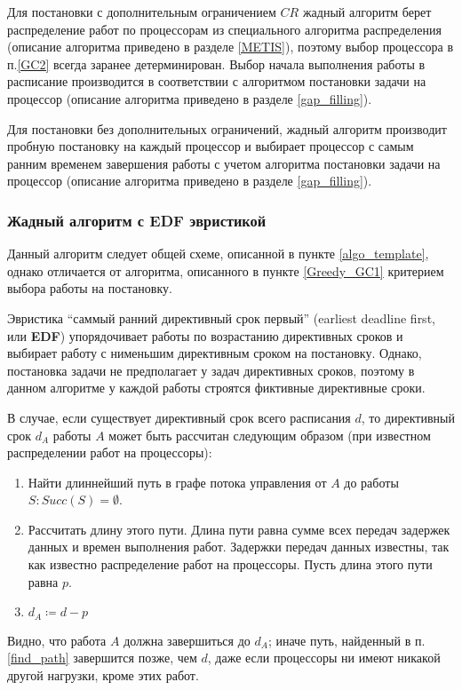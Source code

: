 Для постановки с дополнительным ограничением $CR$ жадный алгоритм берет распределение работ по процессорам из специального алгоритма распределения (описание алгоритма приведено в разделе \ref{METIS}), поэтому выбор процессора в п.\ref{GC2} всегда заранее детерминирован. Выбор начала выполнения работы в расписание производится в соответствии с алгоритмом постановки задачи на процессор (описание алгоритма приведено в разделе \ref{gap_filling}).

Для постановки без дополнительных ограничений, жадный алгоритм производит пробную постановку на каждый процессор и выбирает процессор с самым ранним временем завершения работы с учетом алгоритма постановки задачи на процессор (описание алгоритма приведено в разделе \ref{gap_filling}). 

\subsubsection{Жадный алгоритм с EDF эвристикой} \label{Greedy_EDF}
Данный алгоритм следует общей схеме, описанной в пункте \ref{algo_template}, однако отличается от алгоритма, описанного в пункте \ref{Greedy_GC1} критерием выбора работы на постановку.

Эвристика ``саммый ранний директивный срок первый'' (earliest deadline first, или \textbf{EDF}) упорядочивает работы по возрастанию директивных сроков и выбирает работу с нименьшим директивным сроком на постановку. Однако, постановка задачи не предполагает у задач директивных сроков, поэтому в данном алгоритме у каждой работы строятся фиктивные директивные сроки.

В случае, если существует директивный срок всего расписания $d$, то директивный срок $d_A$ работы $A$ может быть рассчитан следующим образом (при известном распределении работ на процессоры):
\begin{enumerate}
    \item \label{find_path} Найти длиннейший путь в графе потока управления от $A$ до работы $S: Succ(S) = \emptyset$.
    \item Рассчитать длину этого пути. Длина пути равна сумме всех передач задержек данных и времен выполнения работ. Задержки передач данных известны, так как известно распределение работ на процессоры. Пусть длина этого пути равна $p$.
    \item $d_A \coloneqq d - p$
\end{enumerate}
Видно, что работа $A$ должна завершиться до $d_A$; иначе путь, найденный в п.\ref{find_path} завершится позже, чем $d$, даже если процессоры ни имеют никакой другой нагрузки, кроме этих работ.

